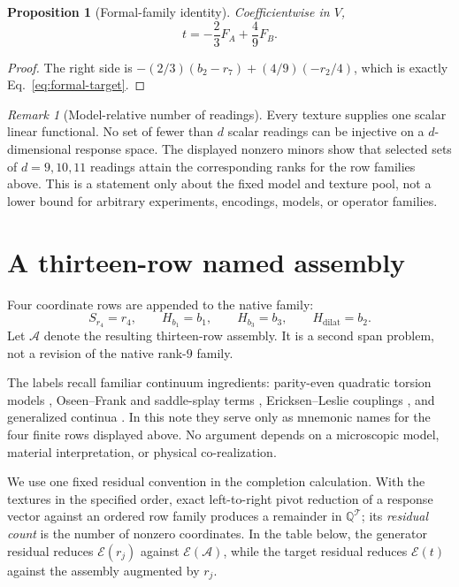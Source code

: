 \documentclass[12pt]{article}
\newtheorem{proposition}[theorem]{Proposition}
\theoremstyle{definition}
\theoremstyle{remark}
\newtheorem{remark}[theorem]{Remark}
\newcommand{\QQ}{\mathbb Q}
\newcommand{\target}{t}
\begin{document}
\begin{proposition}[Formal-family identity]\label{prop:identity}
Coefficientwise in $V$,
\begin{equation}\label{eq:target-identity}
\target=-\frac23F_A+\frac49F_B.
\end{equation}
\end{proposition}

\begin{proof}
The right side is
$-(2/3)(b_2-r_7)+(4/9)(-r_2/4)$, which is exactly
Eq.~\eqref{eq:formal-target}.
\end{proof}

\begin{remark}[Model-relative number of readings]
Every texture supplies one scalar linear functional.  No set of fewer than
$d$ scalar readings can be injective on a $d$-dimensional response space.  The
displayed nonzero minors show that selected sets of $d=9,10,11$ readings attain
the corresponding ranks for the row families above.  This is a statement only
about the fixed model and texture pool, not a lower bound for arbitrary
experiments, encodings, models, or operator families.
\end{remark}

\section{A thirteen-row named assembly}\label{sec:assembly}

Four coordinate rows are appended to the native family:
\[
S_{r_4}=r_4,\qquad H_{b_1}=b_1,\qquad
H_{b_3}=b_3,\qquad H_{\mathrm{dilat}}=b_2.
\]
Let $\mathcal A$ denote the resulting thirteen-row assembly.  It is a second
span problem, not a revision of the native rank-$9$ family.

The labels recall familiar continuum ingredients: parity-even quadratic
torsion models \cite{HayashiShirafuji1979,BlixtHohmannPfeifer2019},
Oseen--Frank and saddle-splay terms \cite{Frank1958,Napoli2010},
Ericksen--Leslie couplings \cite{Leslie1968,GuoEtAl2024}, and generalized
continua \cite{Mindlin1964,GreenRivlin1964}.  In this note they serve only as
mnemonic names for the four finite rows displayed above.  No argument depends
on a microscopic model, material interpretation, or physical co-realization.

We use one fixed residual convention in the completion calculation.  With the
textures in the specified order, exact left-to-right pivot reduction of a
response vector against an ordered row family produces a remainder in
$\QQ^{\mathcal T}$; its \emph{residual count} is the number of nonzero
coordinates.  In the table below, the generator residual reduces
$\mathcal E(r_j)$ against $\mathcal E(\mathcal A)$, while the target residual
reduces $\mathcal E(\target)$ against the assembly augmented by $r_j$.
\end{document}
